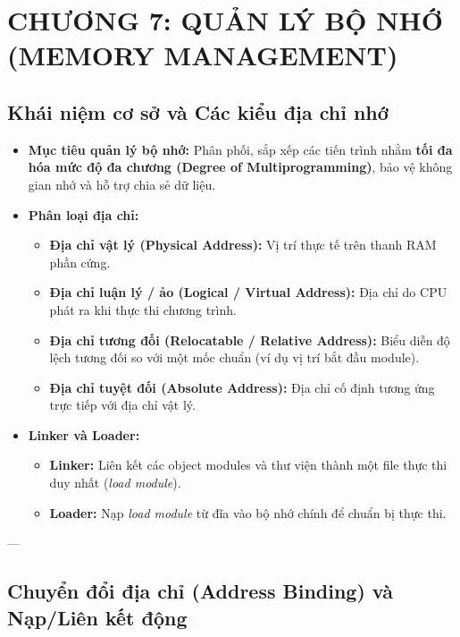 \documentclass[11pt,a4paper]{article}
\begin{document}
\section{CHƯƠNG 7: QUẢN LÝ BỘ NHỚ (MEMORY MANAGEMENT)}

\subsection{Khái niệm cơ sở và Các kiểu địa chỉ nhớ}
\begin{itemize}
    \item \textbf{Mục tiêu quản lý bộ nhớ:} Phân phối, sắp xếp các tiến trình nhằm \textbf{tối đa hóa mức độ đa chương (Degree of Multiprogramming)}, bảo vệ không gian nhớ và hỗ trợ chia sẻ dữ liệu.
    \item \textbf{Phân loại địa chỉ:}
    \begin{itemize}[noitemsep]
        \item \textbf{Địa chỉ vật lý (Physical Address):} Vị trí thực tế trên thanh RAM phần cứng.
        \item \textbf{Địa chỉ luận lý / ảo (Logical / Virtual Address):} Địa chỉ do CPU phát ra khi thực thi chương trình.
        \item \textbf{Địa chỉ tương đối (Relocatable / Relative Address):} Biểu diễn độ lệch tương đối so với một mốc chuẩn (ví dụ vị trí bắt đầu module).
        \item \textbf{Địa chỉ tuyệt đối (Absolute Address):} Địa chỉ cố định tương ứng trực tiếp với địa chỉ vật lý.
    \end{itemize}
    \item \textbf{Linker và Loader:}
    \begin{itemize}[noitemsep]
        \item \textbf{Linker:} Liên kết các object modules và thư viện thành một file thực thi duy nhất (\textit{load module}).
        \item \textbf{Loader:} Nạp \textit{load module} từ đĩa vào bộ nhớ chính để chuẩn bị thực thi.
    \end{itemize}
\end{itemize}

---

\subsection{Chuyển đổi địa chỉ (Address Binding) và Nạp/Liên kết động}
\end{document}
